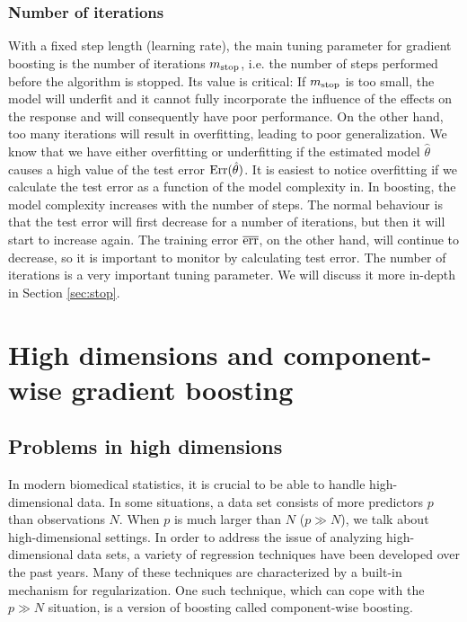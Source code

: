 \subsubsection{Number of iterations}\label{subsec:iterations}
With a fixed step length (learning rate), the main tuning parameter for gradient boosting is the number of iterations $m_{\text{stop}}$, i.e. the number of steps performed before the algorithm is stopped.
Its value is critical:
If $m_{\text{stop}}$ is too small, the model will underfit and it cannot fully incorporate the influence of the effects on the response and will consequently have poor performance.
On the other hand, too many iterations will result in overfitting, leading to poor generalization.
We know that we have either overfitting or underfitting if the estimated model $\hat{\theta}$ causes a high value of the test error $\text{Err}(\hat{\theta})$.
It is easiest to notice overfitting if we calculate the test error as a function of the model complexity in.
In boosting, the model complexity increases with the number of steps.
The normal behaviour is that the test error will first decrease for a number of iterations, but then it will start to increase again.
The training error $\overline{\text{err}}$, on the other hand, will continue to decrease, so it is important to monitor by calculating test error.
The number of iterations is a very important tuning parameter.
We will discuss it more in-depth in Section \ref{sec:stop}.



\section{High dimensions and component-wise gradient boosting}\label{sec:component}
\subsection{Problems in high dimensions}
In modern biomedical statistics, it is crucial to be able to handle high-dimensional data.
In some situations, a data set consists of more predictors $p$ than observations $N$.
When $p$ is much larger than $N$ ($p\gg N$), we talk about high-dimensional settings.
In order to address the issue of analyzing high-dimensional data sets, a variety of regression techniques have been developed over the past years.
Many of these techniques are characterized by a built-in mechanism for regularization.
One such technique, which can cope with the $p\gg N$ situation, is a version of boosting called component-wise boosting.

